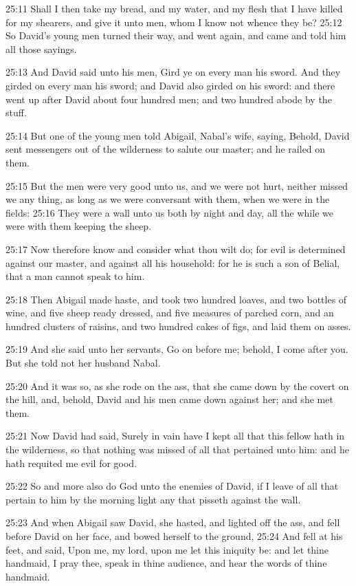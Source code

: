 25:11 Shall I then take my bread, and my water, and my flesh that I
have killed for my shearers, and give it unto men, whom I know not
whence they be?  25:12 So David's young men turned their way, and went
again, and came and told him all those sayings.

25:13 And David said unto his men, Gird ye on every man his sword. And
they girded on every man his sword; and David also girded on his
sword: and there went up after David about four hundred men; and two
hundred abode by the stuff.

25:14 But one of the young men told Abigail, Nabal's wife, saying,
Behold, David sent messengers out of the wilderness to salute our
master; and he railed on them.

25:15 But the men were very good unto us, and we were not hurt,
neither missed we any thing, as long as we were conversant with them,
when we were in the fields: 25:16 They were a wall unto us both by
night and day, all the while we were with them keeping the sheep.

25:17 Now therefore know and consider what thou wilt do; for evil is
determined against our master, and against all his household: for he
is such a son of Belial, that a man cannot speak to him.

25:18 Then Abigail made haste, and took two hundred loaves, and two
bottles of wine, and five sheep ready dressed, and five measures of
parched corn, and an hundred clusters of raisins, and two hundred
cakes of figs, and laid them on asses.

25:19 And she said unto her servants, Go on before me; behold, I come
after you. But she told not her husband Nabal.

25:20 And it was so, as she rode on the ass, that she came down by the
covert on the hill, and, behold, David and his men came down against
her; and she met them.

25:21 Now David had said, Surely in vain have I kept all that this
fellow hath in the wilderness, so that nothing was missed of all that
pertained unto him: and he hath requited me evil for good.

25:22 So and more also do God unto the enemies of David, if I leave of
all that pertain to him by the morning light any that pisseth against
the wall.

25:23 And when Abigail saw David, she hasted, and lighted off the ass,
and fell before David on her face, and bowed herself to the ground,
25:24 And fell at his feet, and said, Upon me, my lord, upon me let
this iniquity be: and let thine handmaid, I pray thee, speak in thine
audience, and hear the words of thine handmaid.

